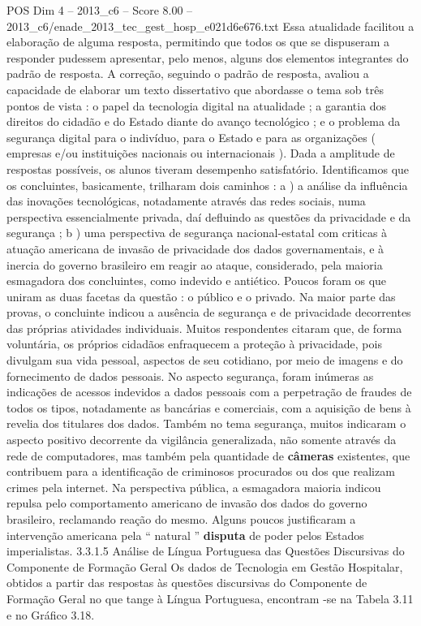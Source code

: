 \begin{textsample}{POS Dim 4 – 2013\_c6 – Score 8.00 – 2013\_c6/enade\_2013\_tec\_gest\_hosp\_e021d6e676.txt}
Essa atualidade facilitou a elaboração de alguma resposta, permitindo que todos os que se dispuseram a responder pudessem apresentar, pelo menos, alguns dos elementos integrantes do padrão de resposta.
A correção, seguindo o padrão de resposta, avaliou a capacidade de elaborar um texto dissertativo que abordasse o tema sob três pontos de vista : o papel da tecnologia digital na atualidade ; a garantia dos direitos do cidadão e do Estado diante do avanço tecnológico ; e o problema da segurança digital para o indivíduo, para o Estado e para as organizações ( empresas e/ou instituições nacionais ou internacionais ).
Dada a amplitude de respostas possíveis, os alunos tiveram desempenho satisfatório.
Identificamos que os concluintes, basicamente, trilharam dois caminhos : a ) a análise da influência das inovações tecnológicas, notadamente através das redes sociais, numa perspectiva essencialmente privada, daí defluindo as questões da privacidade e da segurança ; b ) uma perspectiva de segurança nacional-estatal com criticas à atuação americana de invasão de privacidade dos dados governamentais, e à inercia do governo brasileiro em reagir ao ataque, considerado, pela maioria esmagadora dos concluintes, como indevido e antiético.
Poucos foram os que uniram as duas facetas da questão : o público e o privado.
Na maior parte das provas, o concluinte indicou a ausência de segurança e de privacidade decorrentes das próprias atividades individuais.
Muitos respondentes citaram que, de forma voluntária, os próprios cidadãos enfraquecem a proteção à privacidade, pois divulgam sua vida pessoal, aspectos de seu cotidiano, por meio de imagens e do fornecimento de dados pessoais.
No aspecto segurança, foram inúmeras as indicações de acessos indevidos a dados pessoais com a perpetração de fraudes de todos os tipos, notadamente as bancárias e comerciais, com a aquisição de bens à revelia dos titulares dos dados.
Também no tema segurança, muitos indicaram o aspecto positivo decorrente da vigilância generalizada, não somente através da rede de computadores, mas também pela quantidade de \textbf{câmeras} existentes, que contribuem para a identificação de criminosos procurados ou dos que realizam crimes pela internet.
Na perspectiva pública, a esmagadora maioria indicou repulsa pelo comportamento americano de invasão dos dados do governo brasileiro, reclamando reação do mesmo.
Alguns poucos justificaram a intervenção americana pela “ natural ” \textbf{disputa} de poder pelos Estados imperialistas. 3.3.1.5 Análise de Língua Portuguesa das Questões Discursivas do Componente de Formação Geral Os dados de Tecnologia em Gestão Hospitalar, obtidos a partir das respostas às questões discursivas do Componente de Formação Geral no que tange à Língua Portuguesa, encontram -se na Tabela 3.11 e no Gráfico 3.18.

\end{textsample}

